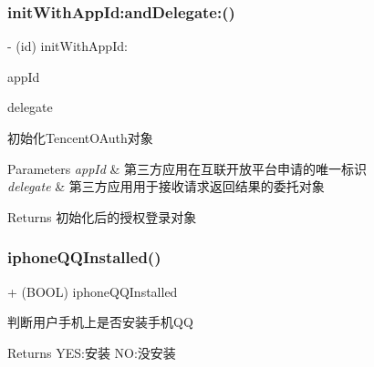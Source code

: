 \subsubsection{\texorpdfstring{init\+With\+App\+Id\+:and\+Delegate\+:()}{initWithAppId:andDelegate:()}\hspace{0.1cm}{\footnotesize\ttfamily [2/2]}}
{\footnotesize\ttfamily -\/ (id) init\+With\+App\+Id\+: \begin{DoxyParamCaption}\item[{(N\+S\+String $\ast$)}]{app\+Id }\item[{andDelegate:(id$<$ \mbox{\hyperlink{protocol_tencent_session_delegate-p}{Tencent\+Session\+Delegate}} $>$)}]{delegate }\end{DoxyParamCaption}}

初始化\+Tencent\+O\+Auth对象 
\begin{DoxyParams}{Parameters}
{\em app\+Id} & 第三方应用在互联开放平台申请的唯一标识 \\
\hline
{\em delegate} & 第三方应用用于接收请求返回结果的委托对象 \\
\hline
\end{DoxyParams}
\begin{DoxyReturn}{Returns}
初始化后的授权登录对象 
\end{DoxyReturn}
\mbox{\label{interface_tencent_o_auth_a482028f5e63604bf91d216c8586a89b6}} 
\subsubsection{\texorpdfstring{iphone\+Q\+Q\+Installed()}{iphoneQQInstalled()}\hspace{0.1cm}{\footnotesize\ttfamily [1/2]}}
{\footnotesize\ttfamily + (B\+O\+OL) iphone\+Q\+Q\+Installed \begin{DoxyParamCaption}{ }\end{DoxyParamCaption}}

判断用户手机上是否安装手机\+QQ \begin{DoxyReturn}{Returns}
Y\+ES\+:安装 NO\+:没安装 
\end{DoxyReturn}
\mbox{\label{interface_tencent_o_auth_a482028f5e63604bf91d216c8586a89b6}} 
